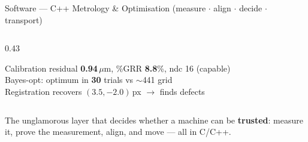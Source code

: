 \documentclass[aspectratio=169,11pt]{beamer}
\begin{document}
\begin{frame}[shrink=10]{Software --- C++ Metrology \& Optimisation (measure $\cdot$ align $\cdot$ decide $\cdot$ transport)}
\begin{columns}[T]
\begin{column}{0.43\textwidth}
      \vspace{0.3em}
      \begin{block}{}
        \footnotesize
        Calibration residual \textcolor{discoblue}{\textbf{0.94}}\,$\mu$m,
          \%GRR \textbf{8.8}\%, ndc 16 (capable)\\
        Bayes-opt: optimum in \textbf{30} trials vs $\sim$441 grid\\
        Registration recovers $(3.5,-2.0)$\,px $\to$ finds defects
      \end{block}
    \end{column}
  \end{columns}
  \vspace{0.2em}
  {\footnotesize\textcolor{discogray}{The unglamorous layer that decides whether a
    machine can be \textbf{trusted}: measure it, prove the measurement, align, and
    move --- all in C/C++.}}
\end{frame}
\end{document}
